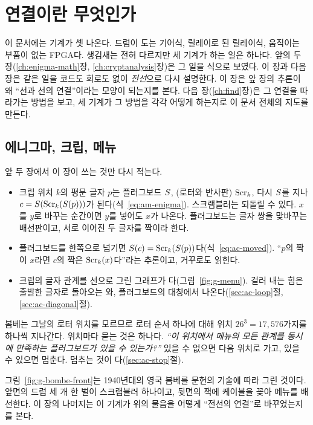 \chapter{연결이란 무엇인가}\label{ch:connect}

이 문서에는 기계가 셋 나온다. 드럼이 도는 기어식, 릴레이로 된 릴레이식, 움직이는 부품이 없는 FPGA다. 생김새는
전혀 다르지만 세 기계가 하는 일은 하나다. 앞의 두 장(\ref{ch:enigma-math}장, \ref{ch:cryptanalysis}장)은 그 일을
식으로 보였다. 이 장과 다음 장은 같은 일을 코드도 회로도 없이 \emph{전선}으로 다시 설명한다. 이 장은 앞 장의 추론이
왜 ``선과 선의 연결''이라는 모양이 되는지를 본다. 다음 장(\ref{ch:find}장)은 그 연결을 따라가는 방법을 보고, 세
기계가 그 방법을 각각 어떻게 하는지로 이 문서 전체의 지도를 만든다.

\section{에니그마, 크립, 메뉴}\label{sec:bombe-one-page}

앞 두 장에서 이 장이 쓰는 것만 다시 적는다.

\begin{itemize}
\item 크립 위치 $k$의 평문 글자 $p$는 플러그보드 $S$, (로터와 반사판) $\mathrm{Scr}_k$, 다시 $S$를
지나 $c = S(\mathrm{Scr}_k(S(p)))$가 된다(식~\eqref{eq:am-enigma}). 스크램블러는 되돌릴 수 있다. $x$를 $y$로 바꾸는 순간이면
$y$를 넣어도 $x$가 나온다. 플러그보드는 글자 쌍을 맞바꾸는 배선판이고, 서로 이어진 두 글자를 
짝이라 한다.
\item 플러그보드를 한쪽으로 넘기면 $S(c) = \mathrm{Scr}_k(S(p))$다(식~\eqref{eq:ac-moved}). ``$p$의 짝이 $x$라면 $c$의
짝은 $\mathrm{Scr}_k(x)$다''라는 추론이고, 거꾸로도 읽힌다.
\item 크립의 글자 관계를 선으로 그린 그래프가 다(그림~\ref{fig:g-menu}). 걸러 내는 힘은 출발한 글자로
돌아오는 와, 플러그보드의 대칭에서 나온다(\ref{sec:ac-loop}절, \ref{sec:ac-diagonal}절).
\end{itemize}

봄베는 그날의 로터 위치를 모르므로 로터 순서 하나에 대해 위치 $26^3 = 17{,}576$가지를 하나씩 지나간다. 위치마다
묻는 것은 하나다. \emph{``이 위치에서 메뉴의 모든 관계를 동시에 만족하는 플러그보드가 있을 수 있는가?''} 있을 수
없으면 다음 위치로 가고, 있을 수 있으면 멈춘다. 멈추는 것이 다(\ref{sec:ac-stop}절).

그림~\ref{fig:g-bombe-front}는 1940년대의 영국 봄베를 문헌의 기술에 따라 그린 것이다. 앞면의 드럼 세 개
한 벌이 스크램블러 하나이고, 뒷면의 잭에 케이블을 꽂아 메뉴를 배선한다. 이 장의 나머지는 이 기계가 위의 물음을
어떻게 ``전선의 연결''로 바꾸었는지를 본다.

